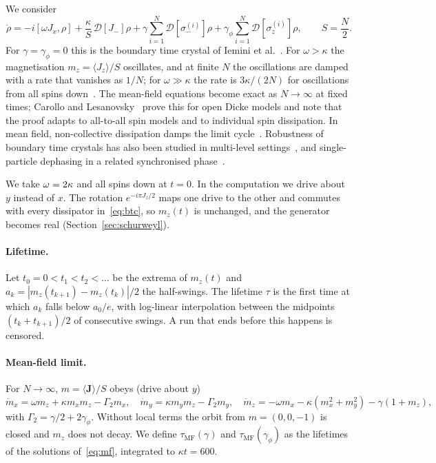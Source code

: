 \documentclass[11pt]{article}
\newcommand{\D}{\mathcal{D}}
\newcommand{\taumf}{\tau_{\mathrm{MF}}}
\begin{document}
We consider
\begin{equation}\label{eq:btc}
  \dot\rho=-i[\omega J_x,\rho]+\frac{\kappa}{S}\,\D[J_-]\rho
  +\gamma\sum_{i=1}^N\D[\sigma_-^{(i)}]\rho+\gamma_\phi\sum_{i=1}^N\D[\sigma_z^{(i)}]\rho,\qquad S=\frac N2 .
\end{equation}
For $\gamma=\gamma_\phi=0$ this is the boundary time crystal of Iemini et al.~\cite{iemini2018}. For $\omega>\kappa$ the
magnetisation $m_z=\langle J_z\rangle/S$ oscillates, and at finite $N$ the oscillations are damped with a rate that
vanishes as $1/N$; for $\omega\gg\kappa$ the rate is $3\kappa/(2N)$ for oscillations from all spins
down~\cite{liu2026,nemeth2025}. The mean-field equations become exact as $N\to\infty$ at fixed times; Carollo and Lesanovsky~\cite{carollo2021}
prove this for open Dicke models and note that the proof adapts to all-to-all spin models and to individual spin
dissipation. In mean field, non-collective dissipation damps the limit cycle~\cite{piccitto2021}.
Robustness of boundary time crystals has also been studied in multi-level settings~\cite{prazeres2021}, and
single-particle dephasing in a related synchronised phase~\cite{tucker2018}.

We take $\omega=2\kappa$ and all spins down at $t=0$. In the computation we drive about $y$ instead of $x$. The
rotation $e^{-i\pi J_z/2}$ maps one drive to the other and commutes with every dissipator in~\eqref{eq:btc}, so $m_z(t)$
is unchanged, and the generator becomes real (Section~\ref{sec:schurweyl}).

\paragraph{Lifetime.} Let $t_0=0<t_1<t_2<\dots$ be the extrema of $m_z(t)$ and $a_k=|m_z(t_{k+1})-m_z(t_k)|/2$ the
half-swings. The lifetime $\tau$ is the first time at which $a_k$ falls below $a_0/e$, with log-linear interpolation
between the midpoints $(t_k+t_{k+1})/2$ of consecutive swings. A run that ends before this happens is censored.

\paragraph{Mean-field limit.} For $N\to\infty$, $m=\langle\mathbf J\rangle/S$ obeys (drive about $y$)
\begin{equation}\label{eq:mf}
  \dot m_x=\omega m_z+\kappa m_xm_z-\Gamma_2m_x,\quad \dot m_y=\kappa m_ym_z-\Gamma_2m_y,\quad
  \dot m_z=-\omega m_x-\kappa(m_x^2+m_y^2)-\gamma(1+m_z),
\end{equation}
with $\Gamma_2=\gamma/2+2\gamma_\phi$. Without local terms the orbit from $m=(0,0,-1)$ is closed and $m_z$ does not decay.
We define $\taumf(\gamma)$ and $\taumf(\gamma_\phi)$ as the lifetimes of the solutions of~\eqref{eq:mf}, integrated
to $\kappa t=600$.
\end{document}
